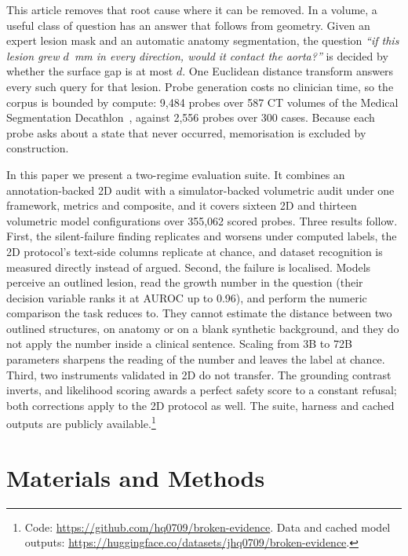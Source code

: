 This article removes that root cause where it can be removed. In a volume, a
useful class of question has an answer that follows from geometry. Given an
expert lesion mask and an automatic anatomy segmentation, the question
\emph{``if this lesion grew $d$~mm in every direction, would it contact the
aorta?''} is decided by whether the surface gap is at most $d$. One Euclidean
distance transform answers every such query for that lesion.
Probe generation costs no clinician time, so the corpus is bounded by
compute: 9{,}484 probes over 587 CT volumes of the Medical Segmentation
Decathlon~\cite{antonelli2022msd}, against 2{,}556 probes over 300 cases.
Because each probe asks about a state that never occurred, memorisation is
excluded by construction.

In this paper we present a two-regime evaluation suite. It combines an
annotation-backed 2D audit with a simulator-backed volumetric audit under one
framework, metrics and composite, and it covers sixteen 2D and thirteen volumetric model configurations over
355{,}062 scored probes. Three results follow. First,
the silent-failure finding replicates and worsens under computed labels, the
2D protocol's text-side columns replicate at chance, and dataset recognition
is measured directly instead of argued. Second, the
failure is localised. Models perceive an outlined lesion, read the growth
number in the question (their decision variable ranks it at AUROC up to
0.96), and perform the numeric comparison the task reduces to. They cannot
estimate the distance between two outlined structures, on anatomy or on a
blank synthetic background, and they do not apply the number inside a
clinical sentence. Scaling from 3B to 72B
parameters sharpens the reading of the number and leaves the label at
chance. Third, two instruments validated in 2D do not transfer. The
grounding contrast inverts, and likelihood scoring awards a perfect safety
score to a constant refusal; both corrections apply to the 2D
protocol as well. The suite, harness and cached outputs are publicly
available.\footnote{Code: \url{https://github.com/hq0709/broken-evidence}. Data and cached model outputs: \url{https://huggingface.co/datasets/jhq0709/broken-evidence}.}

\section{Materials and Methods}
\label{sec:methods}

